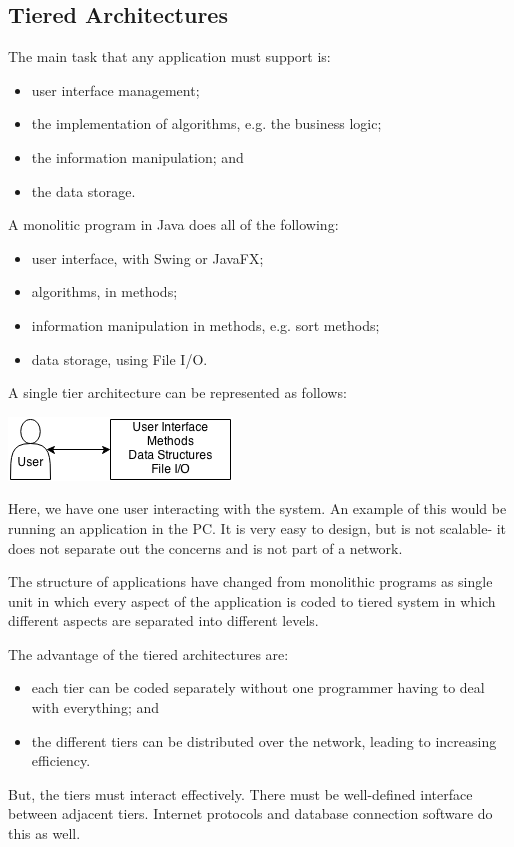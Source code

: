 \documentclass[a4paper, openany]{memoir}
\begin{document}
\subsection{Tiered Architectures}
\noindent The main task that any application must support is:
\begin{itemize}
    \item user interface management;
    \item the implementation of algorithms, e.g. the business logic;
    \item the information manipulation; and
    \item the data storage.
\end{itemize}
A monolitic program in Java does all of the following:
\begin{itemize}
    \item user interface, with Swing or JavaFX;
    \item algorithms, in methods;
    \item information manipulation in methods, e.g. sort methods;
    \item data storage, using File I/O.
\end{itemize}
A single tier architecture can be represented as follows:
\begin{center}
    \includegraphics[scale=0.8]{src/L7I1.png}
\end{center}
Here, we have one user interacting with the system. An example of this would be running an application in the PC. It is very easy to design, but is not scalable- it does not separate out the concerns and is not part of a network.

\noindent The structure of applications have changed from monolithic programs as single unit in which every aspect of the application is coded to tiered system in which different aspects are separated into different levels.

\noindent The advantage of the tiered architectures are:
\begin{itemize}
    \item each tier can be coded separately without one programmer having to deal with everything; and
    \item the different tiers can be distributed over the network, leading to increasing efficiency.
\end{itemize}
\noindent But, the tiers must interact effectively. There must be well-defined interface between adjacent tiers. Internet protocols and database connection software do this as well.
\end{document}
